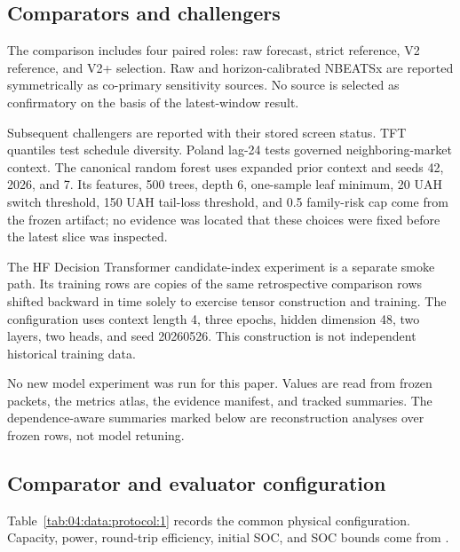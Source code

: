 \subsection{Comparators and challengers}

The comparison includes four paired roles: raw forecast, strict reference, V2 reference, and V2+ selection. Raw and horizon-calibrated NBEATSx are reported symmetrically as co-primary sensitivity sources. No source is selected as confirmatory on the basis of the latest-window result.

Subsequent challengers are reported with their stored screen status. TFT quantiles test schedule diversity. Poland lag-24 tests governed neighboring-market context. The canonical random forest uses expanded prior context and seeds 42, 2026, and 7. Its features, 500 trees, depth 6, one-sample leaf minimum, 20 UAH switch threshold, 150 UAH tail-loss threshold, and 0.5 family-risk cap come from the frozen artifact; no evidence was located that these choices were fixed before the latest slice was inspected.

The HF Decision Transformer candidate-index experiment is a separate smoke path. Its training rows are copies of the same retrospective comparison rows shifted backward in time solely to exercise tensor construction and training. The configuration uses context length 4, three epochs, hidden dimension 48, two layers, two heads, and seed 20260526. This construction is not independent historical training data.

No new model experiment was run for this paper. Values are read from frozen packets, the metrics atlas, the evidence manifest, and tracked summaries. The dependence-aware summaries marked below are reconstruction analyses over frozen rows, not model retuning.

\subsection{Comparator and evaluator configuration}

Table~\ref{tab:04:data:protocol:1} records the common physical configuration. Capacity, power, round-trip efficiency, initial SOC, and SOC bounds come from .

